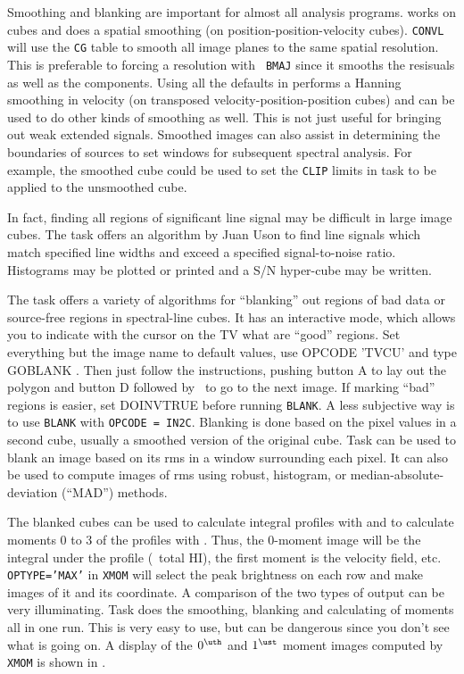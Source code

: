     Smoothing and blanking are important for almost all analysis
programs.  {\tt {}} works on cubes and does a spatial
smoothing (on position-position-velocity cubes).  {\tt CONVL} will use
the {\tt CG} table to smooth all image planes to the same spatial
resolution.  This is preferable to forcing a resolution with {\tt
BMAJ} since it smooths the resisuals as well as the components.  Using
all the defaults in {\tt {}} performs a Hanning smoothing in
velocity (on transposed velocity-position-position cubes) and can be
used to do other kinds of smoothing as well.  This is not just useful
for bringing out weak extended signals.  Smoothed images can also
assist in determining the boundaries of sources to set windows for
subsequent spectral analysis. For example, the smoothed cube could be
used to set the {\tt CLIP} limits in task {\tt {}} to be
applied to the unsmoothed cube.

     In fact, finding all regions of significant line signal may be
difficult in large image cubes.  The task {\tt {}} offers an
algorithm by Juan Uson to find line signals which match specified line
widths and exceed a specified signal-to-noise ratio.  Histograms may
be plotted or printed and a S/N hyper-cube may be written.

    The task {\tt {}} offers a variety of algorithms for
``blanking'' out regions of bad data or source-free regions in
spectral-line cubes.  It has an interactive mode, which allows you to
indicate with the cursor on the TV what are ``good'' regions.  Set
everything but the image name to default values, use {\us OPCODE\qs
'TVCU' \CR} and type {\us GO\qs BLANK \CR}\@.  Then just follow the
instructions, pushing button A to lay out the polygon and button D
followed by \CR\ to go to the next image.  If marking ``bad'' regions
is easier, set {\us DOINV\qs TRUE \CR} before running {\tt BLANK}\@.
A less subjective way is to use {\tt BLANK} with {\tt OPCODE =
IN2C}\@.  Blanking is done based on the pixel values in a second cube,
usually a smoothed version of the original cube.
  Task {\tt {}} can be used to blank an
image based on its rms in a window surrounding each pixel.  It can
also be used to compute images of rms using robust, histogram, or
median-absolute-deviation (``MAD'') methods.

    The blanked cubes can be used to calculate integral profiles with
{\tt {}} and to calculate moments 0 to 3 of the profiles
with {\tt {}}\@. Thus, the 0-moment image will be the
integral under the profile (\eg\ total HI), the first moment is the
velocity field, etc.  {\tt OPTYPE='MAX'} in {\tt XMOM} will select the
peak brightness on each row and make images of it and its coordinate.
A comparison of the two types of output can be very illuminating.
Task {\tt {}} does the smoothing, blanking and calculating
of moments all in one run.  This is very easy to use, but can be
dangerous since you don't see what is going on.  A display of the
$0^{\uth}$ and $1^{\ust}$ moment images computed by {\tt XMOM} is
shown in .

